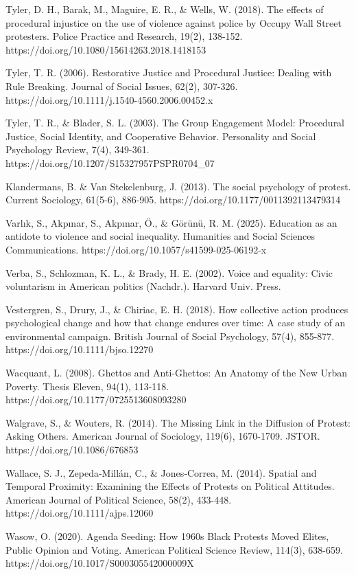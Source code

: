 \documentclass[
  13pt,
]{article}
\begin{document}
Tyler, D. H., Barak, M., Maguire, E. R., \& Wells, W. (2018). The
effects of procedural injustice on the use of violence against police by
Occupy Wall Street protesters. Police Practice and Research, 19(2),
138-152. https://doi.org/10.1080/15614263.2018.1418153

Tyler, T. R. (2006). Restorative Justice and Procedural Justice: Dealing
with Rule Breaking. Journal of Social Issues, 62(2), 307-326.
https://doi.org/10.1111/j.1540-4560.2006.00452.x

Tyler, T. R., \& Blader, S. L. (2003). The Group Engagement Model:
Procedural Justice, Social Identity, and Cooperative Behavior.
Personality and Social Psychology Review, 7(4), 349-361.
https://doi.org/10.1207/S15327957PSPR0704\_07

Klandermans, B. \& Van Stekelenburg, J. (2013). The social psychology of
protest. Current Sociology, 61(5-6), 886-905.
https://doi.org/10.1177/0011392113479314

Varlık, S., Akpınar, S., Akpınar, Ö., \& Görünü, R. M. (2025). Education
as an antidote to violence and social inequality. Humanities and Social
Sciences Communications. https://doi.org/10.1057/s41599-025-06192-x

Verba, S., Schlozman, K. L., \& Brady, H. E. (2002). Voice and equality:
Civic voluntarism in American politics (Nachdr.). Harvard Univ. Press.

Vestergren, S., Drury, J., \& Chiriac, E. H. (2018). How collective
action produces psychological change and how that change endures over
time: A case study of an environmental campaign. British Journal of
Social Psychology, 57(4), 855-877. https://doi.org/10.1111/bjso.12270

Wacquant, L. (2008). Ghettos and Anti-Ghettos: An Anatomy of the New
Urban Poverty. Thesis Eleven, 94(1), 113-118.
https://doi.org/10.1177/0725513608093280

Walgrave, S., \& Wouters, R. (2014). The Missing Link in the Diffusion
of Protest: Asking Others. American Journal of Sociology, 119(6),
1670-1709. JSTOR. https://doi.org/10.1086/676853

Wallace, S. J., Zepeda‐Millán, C., \& Jones‐Correa, M. (2014). Spatial
and Temporal Proximity: Examining the Effects of Protests on Political
Attitudes. American Journal of Political Science, 58(2), 433-448.
https://doi.org/10.1111/ajps.12060

Wasow, O. (2020). Agenda Seeding: How 1960s Black Protests Moved Elites,
Public Opinion and Voting. American Political Science Review, 114(3),
638-659. https://doi.org/10.1017/S000305542000009X
\end{document}
